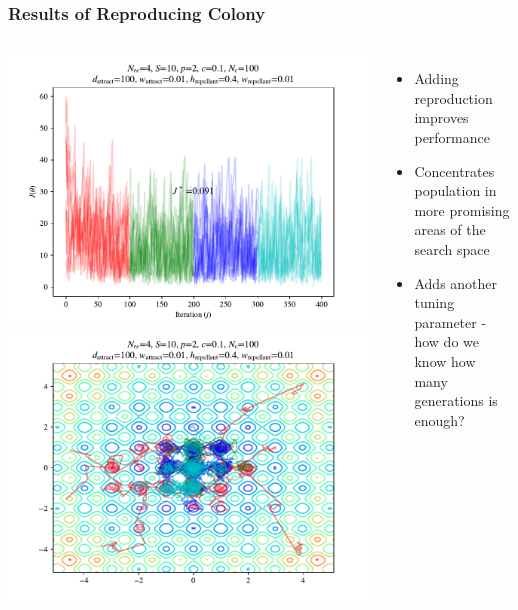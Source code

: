 \documentclass{beamer}
\begin{document}
\begin{frame}
\frametitle{Results of Reproducing Colony}
\begin{columns}[T]
    \begin{center}
      \includegraphics[scale=0.3]{assets/rastrigin_colony_re_J}
      \includegraphics[scale=0.3]{assets/rastrigin_colony_re_theta}
    \end{center}
  \begin{itemize}
    \item<1-> Adding reproduction improves performance
    \item<2-> Concentrates population in more promising areas of the search space
    \item<3-> Adds another tuning parameter - how do we know how many generations is enough?
  \end{itemize}
\end{columns}
\end{frame}
\end{document}
